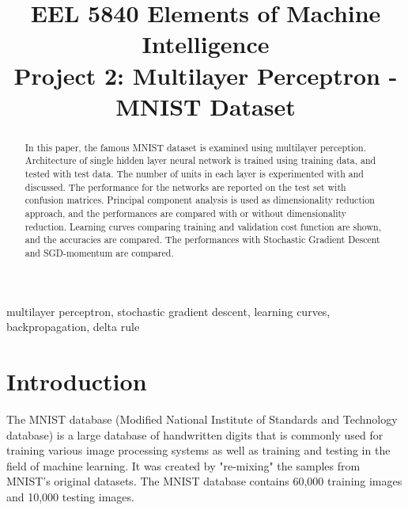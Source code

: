 \documentclass[conference]{IEEEtran}
\begin{document}
\title{EEL 5840 Elements of Machine Intelligence\\ Project 2: Multilayer Perceptron - MNIST Dataset\\
}

\author{


}

\maketitle

\begin{abstract}
In this paper, the famous MNIST dataset is examined using multilayer perception. Architecture of single hidden layer neural network is trained using training data, and tested with test data. The number of units in each layer is experimented with and discussed. The performance for the networks are reported on the test set with confusion matrices. Principal component analysis is used as dimensionality reduction approach, and the performances are compared with or without dimensionality reduction. Learning curves comparing training and validation cost function are shown, and the accuracies are compared. The performances with Stochastic Gradient Descent and SGD-momentum are compared. 
\end{abstract}

\begin{IEEEkeywords}
multilayer perceptron, stochastic gradient descent, learning curves, backpropagation, delta rule
\end{IEEEkeywords}

\section{Introduction}
The MNIST database (Modified National Institute of Standards and Technology database) is a large database of handwritten digits that is commonly used for training various image processing systems as well as training and testing in the field of machine learning. It was created by "re-mixing" the samples from MNIST's original datasets\cite{b1}. The MNIST database contains 60,000 training images and 10,000 testing images.
\end{document}
